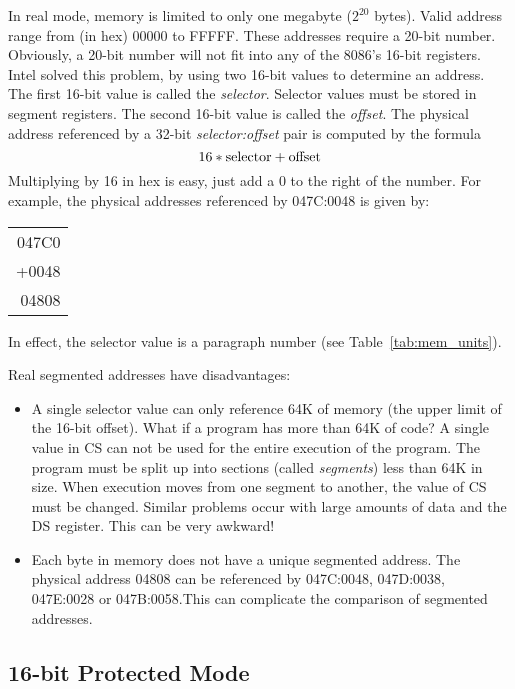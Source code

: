 In  real mode, memory is limited to only one megabyte ($2^{20}$ bytes).
Valid
address range from (in hex) 00000 to FFFFF.\@  %
These addresses require a 20-bit number. Obviously, a 20-bit number will not
fit into any of the 8086's 16-bit registers. Intel solved this problem, by
using two 16-bit values to determine an address. The first 16-bit value is called
the \emph{selector}. Selector values must be stored in segment registers. The
second 16-bit value is called the \emph{offset}. The physical address
referenced by a 32-bit \emph{selector:offset} pair is computed by the formula
\[ 16 * {\rm selector} + {\rm offset} \]
Multiplying by 16 in hex is easy, just add a 0 to the right of the number. For
example, the physical addresses referenced by 047C:0048 is given by:
\begin{center}
\begin{tabular}{r}
047C0 \\
+0048 \\
\hline
04808 \\
\end{tabular}
\end{center}
In effect, the selector value is a paragraph number
(see Table~\ref{tab:mem_units}).

Real segmented addresses have disadvantages:
\begin{itemize}
\item A single selector value can only reference 64K of memory (the
upper limit of the 16-bit offset). What if a program has more than 64K
of code? A single value in CS can not be used for the entire execution
of the program.  The program must be split up into sections (called
\emph{segments}) less than 64K in size. When
execution moves from one segment to another, the value of CS must be
changed. Similar problems occur with large amounts of data and the DS
register. This can be very awkward!

\item Each byte in memory does not have a unique segmented address. The
physical address 04808 can be referenced by 047C:0048, 047D:0038, 047E:0028
or 047B:0058.\@ This can complicate the comparison of segmented addresses.

\end{itemize}

\subsection{16-bit Protected Mode \label{16prot_mode} }


